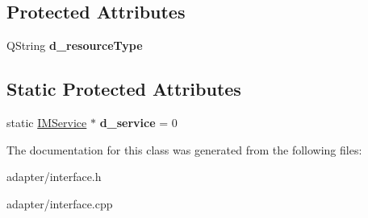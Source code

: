 \subsection*{Protected Attributes}
\begin{DoxyCompactItemize}
\item 
\hypertarget{classIMFramework_1_1IMInterface_a03eb5d026d7c48aa42f0a4485287ff5a}{
QString {\bfseries d\_\-resourceType}}
\label{classIMFramework_1_1IMInterface_a03eb5d026d7c48aa42f0a4485287ff5a}

\end{DoxyCompactItemize}
\subsection*{Static Protected Attributes}
\begin{DoxyCompactItemize}
\item 
\hypertarget{classIMFramework_1_1IMInterface_a5ee23f1ea7973b053c3680c7ec37e312}{
static \hyperlink{classIMService}{IMService} $\ast$ {\bfseries d\_\-service} = 0}
\label{classIMFramework_1_1IMInterface_a5ee23f1ea7973b053c3680c7ec37e312}

\end{DoxyCompactItemize}


The documentation for this class was generated from the following files:\begin{DoxyCompactItemize}
\item 
adapter/interface.h\item 
adapter/interface.cpp\end{DoxyCompactItemize}
